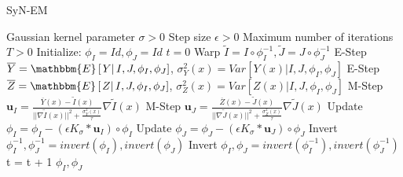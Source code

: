 \begin{algorithm}[h!]
\caption{SyN-EM}\label{alg:SyNEM}
\begin{algorithmic}[1]
\REQUIRE Gaussian kernel parameter $\sigma>0$
\REQUIRE Step size $\epsilon>0$
\REQUIRE Maximum number of iterations $T>0$
\STATE Initialize: $\phi_{I} = Id, \phi_{J} = Id$
\STATE $t=0$
\REPEAT
    \STATE Warp $\tilde{I}  = I \circ \phi_{I}^{-1}, \tilde{J} = J \circ \phi_{J}^{-1}$
    \STATE E-Step $\overline{Y} = \mathbbm{E}\left[\left.Y\right| I, J, \phi_{I}, \phi_{J}\right]$, $\sigma^{2}_{Y}(x) = Var\left[\left.Y(x)\right| I, J, \phi_{I}, \phi_{J}\right]$
    \STATE E-Step $\overline{Z} = \mathbbm{E}\left[\left.Z\right| I, J, \phi_{I}, \phi_{J}\right]$, $\sigma^{2}_{Z}(x) = Var\left[\left.Z(x)\right| I, J, \phi_{I}, \phi_{J}\right]$
    \STATE M-Step $\mathbf{u}_{I} = \frac{\overline{Y}(x) - \tilde{I}(x)}{||\nabla \tilde{I}(x)||^{2} + \frac{\sigma_{Y}^{2}(x)}{\tau}}\nabla \tilde{I}(x)$
    \STATE M-Step $\mathbf{u}_{J} = \frac{\overline{Z}(x) - \tilde{J}(x)}{||\nabla \tilde{J}(x)||^{2} + \frac{\sigma_{Z}^{2}(x)}{\tau}}\nabla \tilde{J}(x)$
    \STATE Update $\phi_{I} = \phi_{I} - \left(\epsilon K_{\sigma} \ast \mathbf{u}_{I} \right)\circ \phi_{I}$
    \STATE Update $\phi_{J} = \phi_{J} - \left(\epsilon K_{\sigma} \ast \mathbf{u}_{J} \right)\circ \phi_{J}$
    \STATE Invert $\phi_{I}^{-1}, \phi_{J}^{-1} = invert(\phi_{I}), invert(\phi_{J})$
    \STATE Invert $\phi_{I}, \phi_{J} = invert(\phi_{I}^{-1}), invert(\phi_{J}^{-1})$
    \STATE t = t + 1
\RETURN $\phi_{I}, \phi_{J}$
\end{algorithmic}
\end{algorithm}


